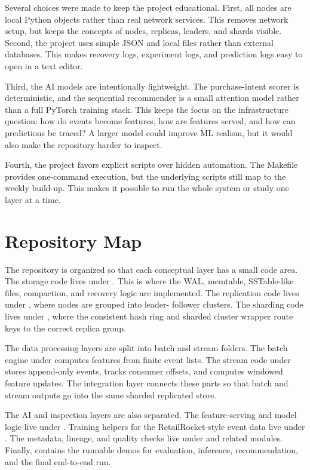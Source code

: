 Several choices were made to keep the project educational. First, all nodes are
local Python objects rather than real network services. This removes network
setup, but keeps the concepts of nodes, replicas, leaders, and shards visible.
Second, the project uses simple JSON and local files rather than external
databases. This makes recovery logs, experiment logs, and prediction logs easy
to open in a text editor.

Third, the AI models are intentionally lightweight. The purchase-intent scorer
is deterministic, and the sequential recommender is a small attention model
rather than a full PyTorch training stack. This keeps the focus on the
infrastructure question: how do events become features, how are features served,
and how can predictions be traced? A larger model could improve ML realism, but
it would also make the repository harder to inspect.

Fourth, the project favors explicit scripts over hidden automation. The
Makefile provides one-command execution, but the underlying scripts still map to
the weekly build-up. This makes it possible to run the whole system or study
one layer at a time.

\section{Repository Map}\label{sec:repomap}

The repository is organized so that each conceptual layer has a small code
area. The storage code lives under . This is
where the WAL, memtable, SSTable-like files, compaction, and recovery logic are
implemented. The replication code lives under
, where nodes are grouped into leader-
follower clusters. The sharding code lives under
, where the consistent hash ring and sharded
cluster wrapper route keys to the correct replica group.

The data processing layers are split into batch and stream folders. The batch
engine under  computes features from finite event
lists. The stream code under  stores append-only
events, tracks consumer offsets, and computes windowed feature updates. The
integration layer connects these parts so that batch and stream outputs go into
the same sharded replicated store.

The AI and inspection layers are also separated. The feature-serving and model
logic live under . Training helpers for the
RetailRocket-style event data live under .
The metadata, lineage, and quality checks live under 
and related modules. Finally,  contains the
runnable demos for evaluation, inference, recommendation, and the final
end-to-end run.


